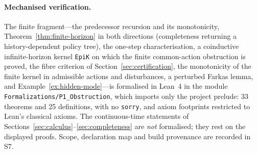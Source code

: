 \paragraph{Mechanised verification.} The finite fragment---the predecessor recursion and its monotonicity, Theorem~\ref{thm:finite-horizon} in both directions (completeness returning a history-dependent policy tree), the one-step characterisation, a coinductive infinite-horizon kernel \texttt{EpiK} on which the finite common-action obstruction is proved, the fibre criterion of Section~\ref{sec:certification}, the monotonicity of the finite kernel in admissible actions and disturbances, a perturbed Farkas lemma, and Example~\ref{ex:hidden-mode}---is formalised in Lean~4 in the module \texttt{Formalizations/P1\_Obstruction}, which imports only the project prelude: 33 theorems and 25 definitions, with no \texttt{sorry}, and axiom footprints restricted to Lean's classical axioms. The continuous-time statements of Sections~\ref{sec:calculus}--\ref{sec:completeness} are \emph{not} formalised; they rest on the displayed proofs. Scope, declaration map and build provenance are recorded in S7.
